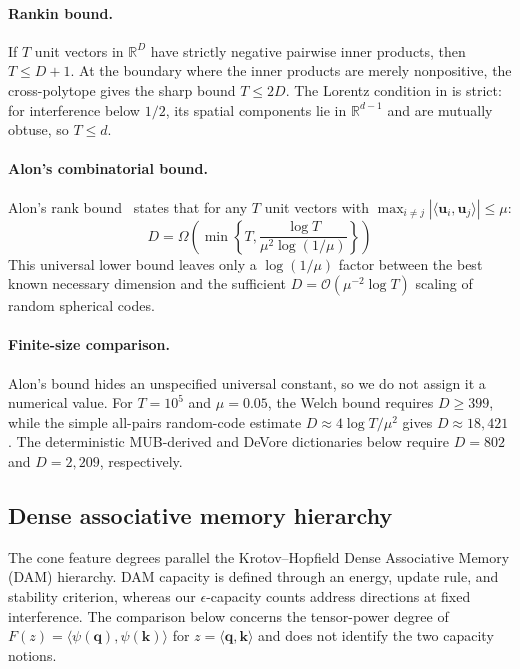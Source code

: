 \documentclass{article}
\newcommand{\1}{\bm{1}}
\newcommand{\lrangle}[1]{\langle#1\rangle}
\def\eps{{\epsilon}}
\def\vk{{\bm{k}}}
\def\vq{{\bm{q}}}
\def\vu{{\bm{u}}}
\def\gO{{\mathcal{O}}}
\newcommand{\R}{\mathbb{R}}
\newcommand{\seql}{T}
\theoremstyle{definition}
\begin{document}
\paragraph{Rankin bound.} If $\seql$ unit vectors in $\R^D$ have strictly negative pairwise inner
products, then $\seql\le D+1$. At the boundary where the inner products are merely nonpositive, the
cross-polytope gives the sharp bound $\seql\le2D$. The Lorentz condition in  is strict:
for interference below $1/2$, its spatial components lie in $\R^{d-1}$ and are mutually obtuse, so
$\seql\le d$.


\paragraph{Alon's combinatorial bound.} Alon's rank bound~\citep{alon09rank} states that for any $\seql$ unit vectors with
$\max_{i\ne j}|\lrangle{\vu_i,\vu_j}|\le\mu$:
\[
  D
  = \Omega\!\left(
      \min\!\left\{\seql,\frac{\log \seql}{\mu^2\log(1/\mu)}\right\}
    \right)
\]
This universal lower bound leaves only a $\log(1/\mu)$ factor between the best known necessary
dimension and the sufficient $D=\gO(\mu^{-2}\log \seql)$ scaling of random spherical codes.


\paragraph{Finite-size comparison.} Alon's bound hides an unspecified universal constant, so we do
not assign it a numerical value. For $\seql=10^5$ and $\mu=0.05$, the Welch bound requires $D\ge399$,
while the simple all-pairs random-code estimate $D\approx4\log \seql/\mu^2$ gives $D\approx18{,}421$.
The deterministic MUB-derived and DeVore dictionaries below require $D=802$ and $D=2{,}209$,
respectively.


\subsection{Dense associative memory hierarchy}
\label{app:dam}

The cone feature degrees parallel the Krotov--Hopfield Dense Associative Memory (DAM) hierarchy.
DAM capacity is defined through an energy, update rule, and stability criterion, whereas our
$\eps$-capacity counts address directions at fixed interference. The comparison below concerns the
tensor-power degree of $F(z)=\lrangle{\psi(\vq),\psi(\vk)}$ for
$z=\lrangle{\vq,\vk}$ and does not identify the two capacity notions.
\end{document}
